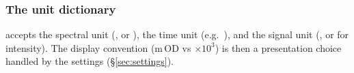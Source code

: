 \subsubsection{The unit dictionary}
 accepts the spectral unit
 (,  or ),
the time unit  (e.g.\ ), and the signal unit
 (,  or  for intensity). The
\dA{} display convention (m\,OD vs $\times 10^{3}$) is then a presentation choice
handled by the settings (\S\ref{sec:settings}).
